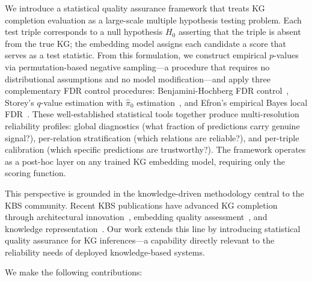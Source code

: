 We introduce a statistical quality assurance framework that treats KG completion evaluation as a large-scale multiple hypothesis testing problem.
Each test triple corresponds to a null hypothesis $H_0$ asserting that the triple is absent from the true KG; the embedding model assigns each candidate a score that serves as a test statistic.
From this formulation, we construct empirical $p$-values via permutation-based negative sampling---a procedure that requires no distributional assumptions and no model modification---and apply three complementary FDR control procedures: Benjamini-Hochberg FDR control~\cite{benjamini1995controlling}, Storey's $q$-value estimation with $\hat{\pi}_0$ estimation~\cite{storey2002direct}, and Efron's empirical Bayes local FDR~\cite{efron2004large}.
These well-established statistical tools together produce multi-resolution reliability profiles: global diagnostics (what fraction of predictions carry genuine signal?), per-relation stratification (which relations are reliable?), and per-triple calibration (which specific predictions are trustworthy?).
The framework operates as a post-hoc layer on any trained KG embedding model, requiring only the scoring function.

This perspective is grounded in the knowledge-driven methodology central to the KBS community.
Recent KBS publications have advanced KG completion through architectural innovation~\cite{fang2025knowledge,shang2024learnable,lu2024deep}, embedding quality assessment~\cite{purohit2025vanilla}, and knowledge representation~\cite{le2023knowledge,zhang2023conflict}.
Our work extends this line by introducing statistical quality assurance for KG inferences---a capability directly relevant to the reliability needs of deployed knowledge-based systems.

We make the following contributions:

